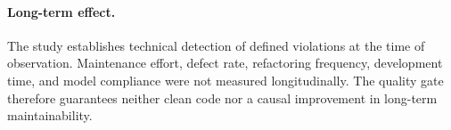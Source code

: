 \paragraph{Long-term effect.}
The study establishes technical detection of defined violations at the time of
observation. Maintenance effort, defect rate, refactoring frequency,
development time, and model compliance were not measured longitudinally. The
quality gate therefore guarantees neither clean code nor a causal improvement
in long-term maintainability.
